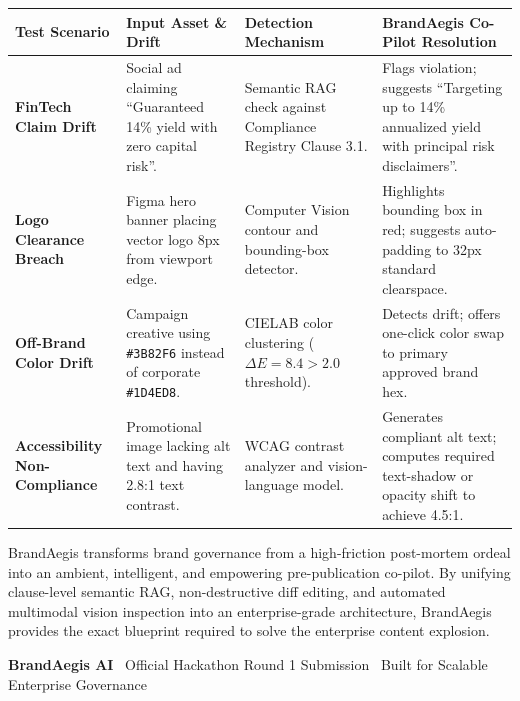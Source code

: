 \documentclass[10pt,a4paper]{article}
\begin{document}
\begin{table}[h!]
\centering
\small
\renewcommand{\arraystretch}{1.2}
\begin{tabularx}{\textwidth}{p{2.3cm} p{3.8cm} p{3.8cm} X}
\toprule
\textbf{Test Scenario} & \textbf{Input Asset \& Drift} & \textbf{Detection Mechanism} & \textbf{BrandAegis Co-Pilot Resolution} \\
\midrule
\textbf{FinTech Claim Drift} & Social ad claiming ``Guaranteed 14\% yield with zero capital risk''. & Semantic RAG check against Compliance Registry Clause 3.1. & Flags violation; suggests ``Targeting up to 14\% annualized yield with principal risk disclaimers''. \\
\midrule
\textbf{Logo Clearance Breach} & Figma hero banner placing vector logo 8px from viewport edge. & Computer Vision contour and bounding-box detector. & Highlights bounding box in red; suggests auto-padding to 32px standard clearspace. \\
\midrule
\textbf{Off-Brand Color Drift} & Campaign creative using \texttt{\#3B82F6} instead of corporate \texttt{\#1D4ED8}. & CIELAB color clustering ($\Delta E = 8.4 > 2.0$ threshold). & Detects drift; offers one-click color swap to primary approved brand hex. \\
\midrule
\textbf{Accessibility Non-Compliance} & Promotional image lacking alt text and having 2.8:1 text contrast. & WCAG contrast analyzer and vision-language model. & Generates compliant alt text; computes required text-shadow or opacity shift to achieve 4.5:1. \\
\bottomrule
\end{tabularx}
\end{table}

\vspace{0.15cm}

\begin{tcolorbox}[
  enhanced,
  colback=slatebg,
  colframe=primarydark,
  arc=2.5mm,
  boxrule=0.8pt,
  title={\textbf{\color{white}Summary of Hackathon Alignment \& Round 2 Readiness}},
  colbacktitle=primarydark,
  left=8pt,right=8pt,top=6pt,bottom=6pt
]
\small
BrandAegis transforms brand governance from a high-friction post-mortem ordeal into an ambient, intelligent, and empowering pre-publication co-pilot. By unifying clause-level semantic RAG, non-destructive diff editing, and automated multimodal vision inspection into an enterprise-grade architecture, BrandAegis provides the exact blueprint required to solve the enterprise content explosion.
\end{tcolorbox}

\vspace{0.1cm}
\begin{center}
  \footnotesize\color{textmuted}
  \textbf{BrandAegis AI} \textbar\ Official Hackathon Round 1 Submission \textbar\ Built for Scalable Enterprise Governance
\end{center}
\end{document}

